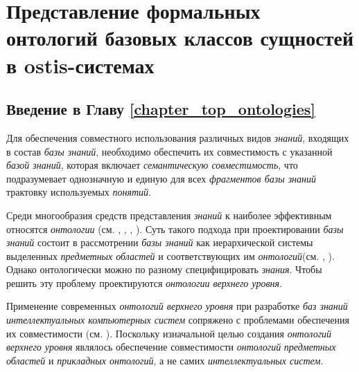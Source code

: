 \chapter{Представление формальных онтологий базовых классов сущностей в ostis-системах}
\label{chapter_top_ontologies}

\vspace{-7\baselineskip}

\begin{SCn}

\end{SCn}

\section*{Введение в Главу \ref{chapter_top_ontologies}}

Для обеспечения совместного использования различных видов \textit{знаний}, входящих в состав \textit{базы знаний}, необходимо обеспечить их совместимость с указанной \textit{базой знаний}, которая включает \textit{семантическую совместимость}, что подразумевает однозначную и единую для всех \textit{фрагментов базы знаний} трактовку используемых \textit{понятий}.

Среди многообразия средств представления \textit{знаний} к наиболее эффективным относятся \textit{онтологии }(см. , , , ). Суть такого подхода при проектировании \textit{базы знаний} состоит в рассмотрении \textit{базы знаний} как иерархической системы выделенных \textit{предметных областей} и соответствующих им \textit{онтологий}(см. , ). Однако онтологически можно по разному специфицировать \textit{знания}. Чтобы решить эту проблему проектируются \textit{онтологии верхнего уровня}.

Применение современных \textit{онтологий верхнего уровня} при разработке \textit{баз знаний} \textit{интеллектуальных компьютерных систем} сопряжено с проблемами обеспечения их совместимости (см. ). Поскольку изначальной целью создания \textit{онтологий верхнего уровня} являлось обеспечение  совместимости \textit{онтологий} \textit{предметных областей} и \textit{прикладных онтологий}, а не самих \textit{интеллектуальных систем}. 

